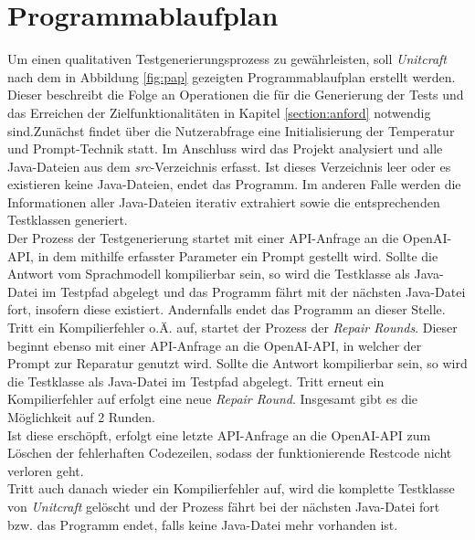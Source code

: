 \section{Programmablaufplan}
Um einen qualitativen Testgenerierungsprozess zu gewährleisten, soll \textit{Unitcraft} nach dem in Abbildung \ref{fig:pap} gezeigten Programmablaufplan erstellt werden. Dieser beschreibt die Folge an Operationen die für die Generierung der Tests und das Erreichen der Zielfunktionalitäten in Kapitel \ref{section:anford} notwendig sind.Zunächst findet über die Nutzerabfrage eine Initialisierung der Temperatur und Prompt-Technik statt. Im Anschluss wird das Projekt analysiert und alle Java-Dateien aus dem \textit{src}-Verzeichnis erfasst. Ist dieses Verzeichnis leer oder es existieren keine Java-Dateien, endet das Programm. Im anderen Falle werden die Informationen aller Java-Dateien iterativ extrahiert sowie die entsprechenden Testklassen generiert.\\Der Prozess der Testgenerierung startet mit einer API-Anfrage an die OpenAI-API, in dem mithilfe erfasster Parameter ein Prompt gestellt wird. Sollte die Antwort vom Sprachmodell kompilierbar sein, so wird die Testklasse als Java-Datei im Testpfad abgelegt und das Programm fährt mit der nächsten Java-Datei fort, insofern diese existiert. Andernfalls endet das Programm an dieser Stelle.\\Tritt ein Kompilierfehler o.Ä. auf, startet der Prozess der \textit{Repair Rounds}. Dieser beginnt ebenso mit einer API-Anfrage an die OpenAI-API, in welcher der Prompt zur Reparatur genutzt wird. Sollte die Antwort kompilierbar sein, so wird die Testklasse als Java-Datei im Testpfad abgelegt. Tritt erneut ein Kompilierfehler auf erfolgt eine neue \textit{Repair Round}. Insgesamt gibt es die Möglichkeit auf 2 Runden.\\Ist diese erschöpft, erfolgt eine letzte API-Anfrage an die OpenAI-API zum Löschen der fehlerhaften Codezeilen, sodass der funktionierende Restcode nicht verloren geht.\\Tritt auch danach wieder ein Kompilierfehler auf, wird die komplette Testklasse von \textit{Unitcraft} gelöscht und der Prozess fährt bei der nächsten Java-Datei fort bzw. das Programm endet, falls keine Java-Datei mehr vorhanden ist.